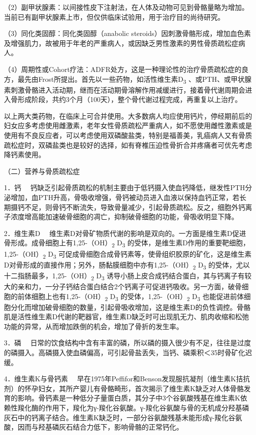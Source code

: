 （2）副甲状腺素：以间接性皮下注射法，在人体及动物可见到骨骼量略为增加。当前已有副甲状腺素上市，但仅供临床试验用，用于治疗目的尚待研究。

（3）同化类固醇：同化类固醇（anabolic
steroids）因刺激骨骼形成，增加血色素及增强肌力，故被用于年老的严重病人，或因缺乏男性激素的男性骨质疏松症病人。

（4）周期性或Cohort疗法：ADFR处方，这是一种理论性的治疗骨质疏松症的良方，最先由Frost所提出。首先以一些药物，如活性维生素D\textsubscript{3}
、或PTH、或甲状腺素刺激骨骼进入活动期，继而在活动期骨溶解作用减缓进行，接着骨代谢周期会进入骨形成阶段，共约3个月（100天），整个骨代谢过程完成，再重复以上治疗。

以上两大类药物，在临床上可合并使用。大多数病人均应使用钙片，停经期前后的妇女应多考虑使用雌激素，老年女性骨质疏松严重病人，如不愿使用雌性激素或是使用有不良反应者，可以考虑使用双磷酸盐类，特别是福善美，乳癌病人又有骨质疏松症时，双磷盐类也是较好的选择，如有脊椎压迫性骨折合并疼痛者可优先考虑降钙素使用。

（二）营养与骨质疏松症

{1．钙}
　钙缺乏引起骨质疏松的机制主要由于低钙摄入使血钙降低，继发性PTH分泌增加，血PTH升高，骨吸收增强，骨钙被动员进入血液以保持血钙正常，若长期摄钙不足，则骨钙不断流失，导致骨量减少，引起骨质疏松。反之，细胞外钙离子浓度增高能加速破骨细胞的凋亡，抑制破骨细胞的功能，骨吸收明显下降。

{2．维生素D}
　维生素D对骨矿物质代谢的影响是双向的。一方面是维生素D促进骨形成。成骨细胞上有1,25-（OH）\textsubscript{2}
D\textsubscript{3}
的受体，是维生素D作用的重要靶细胞，1,25-（OH）\textsubscript{2}
D\textsubscript{3}
可促成骨细胞合成骨钙素等，使骨组织胶原的矿化，这是维生素D对骨形成的直接作用；另外，肠黏膜细胞中亦有1,25-（OH）\textsubscript{2}
D\textsubscript{3}
的受体，尤以十二指肠最多，1,25-（OH）\textsubscript{2}
D\textsubscript{3}
诱导小肠上皮合成钙结合蛋白，其与钙离子有较大的亲和力，一分子钙结合蛋白结合2个钙离子可促进钙吸收。另一方面，破骨细胞的前体细胞上也有1,25-（OH）\textsubscript{2}
D\textsubscript{3} 的受体，1,25-（OH）\textsubscript{2}
D\textsubscript{3}
也能促进前体细胞分化而增加破骨细胞的数量，引起骨吸收增加，这是维生素D的负性调控。骨骼肌是活性维生素D代谢的靶器官，维生素D缺乏时可出现肌无力、肌肉收缩和松弛功能的异常，从而增加跌倒的机会，增加了骨折的发生率。

{3．磷}
　日常的饮食结构中含有丰富的磷，所以磷的摄入很少有不足，往往是过度的磷摄入。高磷摄入使血磷偏高，可引起骨盐丢失，当钙、磷乘积＜35时骨矿化迟缓。

{4．维生素K与骨钙素}
　早在1975年Peffifor和Benson发现服抗凝剂（维生素K拮抗剂）的怀孕妇女，其所产婴儿有骨骼畸形，首次揭示了维生素K缺乏对人体骨骼发育的影响。骨钙素是一种低分子量蛋白质，其分子中3个谷氨酸残基在维生素K依赖性羧化酶的作用下，羧化为γ-羧化谷氨酸。γ-羧化谷氨酸与骨的无机成分羟基磷灰石中的钙离子结合。维生素K缺乏时，一部分谷氨酸残基未能形成γ-羧化谷氨酸，因而与羟基磷灰石结合力低下，影响骨骼的正常钙化。

